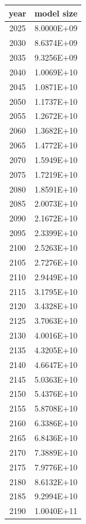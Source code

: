 \documentclass[a4paper]{article}
\begin{document}
    \small
    
    \begin{tabular}{| c | c |}
    	\hline
    	year & model size \\\hline
    	2025 & 8.0000E+09 \\\hline
    	2030 & 8.6374E+09 \\\hline
    	2035 & 9.3256E+09 \\\hline
    	2040 & 1.0069E+10 \\\hline
    	2045 & 1.0871E+10 \\\hline
    	2050 & 1.1737E+10 \\\hline
    	2055 & 1.2672E+10 \\\hline
    	2060 & 1.3682E+10 \\\hline
    	2065 & 1.4772E+10 \\\hline
    	2070 & 1.5949E+10 \\\hline
    	2075 & 1.7219E+10 \\\hline
    	2080 & 1.8591E+10 \\\hline
    	2085 & 2.0073E+10 \\\hline
    	2090 & 2.1672E+10 \\\hline
    	2095 & 2.3399E+10 \\\hline
    	2100 & 2.5263E+10 \\\hline
    	2105 & 2.7276E+10 \\\hline
    	2110 & 2.9449E+10 \\\hline
    	2115 & 3.1795E+10 \\\hline
    	2120 & 3.4328E+10 \\\hline
    	2125 & 3.7063E+10 \\\hline
    	2130 & 4.0016E+10 \\\hline
    	2135 & 4.3205E+10 \\\hline
    	2140 & 4.6647E+10 \\\hline
    	2145 & 5.0363E+10 \\\hline
    	2150 & 5.4376E+10 \\\hline
    	2155 & 5.8708E+10 \\\hline
    	2160 & 6.3386E+10 \\\hline
    	2165 & 6.8436E+10 \\\hline
    	2170 & 7.3889E+10 \\\hline
    	2175 & 7.9776E+10 \\\hline
    	2180 & 8.6132E+10 \\\hline
    	2185 & 9.2994E+10 \\\hline
    	2190 & 1.0040E+11 \\\hline

\end{tabular}
\end{document}
